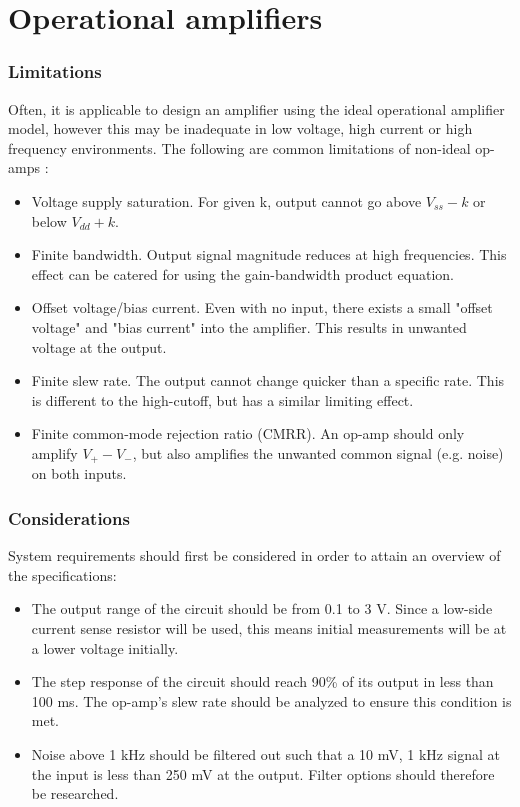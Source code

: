 \graphicspath{{content/1_literatureReview/figures/}}
\section{Operational amplifiers}\label{sec:opamps}

\subsubsection{Limitations}\label{sec:opamps_limits}
Often, it is applicable to design an amplifier using the ideal operational amplifier model, however this may be inadequate
in low voltage, high current or high frequency environments. The following are common limitations of non-ideal op-amps \cite{opAmpLimitations}:
\begin{itemize}
    \item Voltage supply saturation. For given k, output cannot go above $V_{ss} - k$ or below  $V_{dd} + k$.
    \item Finite bandwidth. Output signal magnitude reduces at high frequencies. This effect can be catered for using the gain-bandwidth product equation.
    \item Offset voltage/bias current. Even with no input, there exists a small "offset voltage" and "bias current" into the amplifier.
          This results in unwanted voltage at the output.
    \item Finite slew rate. The output cannot change quicker than a specific rate. This is different to the high-cutoff, but has a similar limiting effect.
    \item Finite common-mode rejection ratio (CMRR). An op-amp should only amplify $V_{+} - V_{-}$, but also amplifies the unwanted common signal (e.g. noise) on both inputs.
\end{itemize}

\subsubsection{Considerations}\label{sec:opamps_considerations}
System requirements should first be considered in order to attain an overview of the specifications:
\begin{itemize}
    \item The output range of the circuit should be from 0.1 to 3 V. Since a low-side current sense resistor will be used, this means initial measurements will be at a lower voltage initially.
    \item The step response of the circuit should reach 90\% of its output in less than 100 ms. The op-amp's slew rate should be analyzed to ensure this condition is met.
    \item Noise above 1 kHz should be filtered out such that a 10 mV, 1 kHz signal at the input is less than 250 mV at the output. Filter options should therefore be researched.
\end{itemize}

